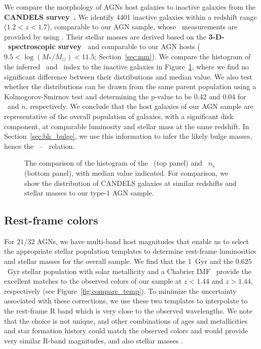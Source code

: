 \documentclass[apj]{emulateapj}
\begin{document}
We compare the morphology of AGNs host galaxies to inactive galaxies from the {\bf CANDELS survey~\citep{Grogin2011, Koekemoer2011}.} We identify 4401 inactive galaxies within a redshift range ($1.2<z<1.7$), comparable to our AGN sample, whose \sersic\ measurements are provided by \citet{VDwel++2012} using \galfit. Their stellar masses are derived based on the {\bf 3-D-\hst\ spectroscopic survey~\citep{Momcheva2016, Brammer2012} } and comparable to our AGN hosts ($9.5< \log (M_* /M_{\odot})< 11.5$; Section~\ref{sec:mm}). We compare the histogram of the inferred \Reff\ and \sersic\ index to the inactive galaxies in Figure~\ref{fig:hist_rn}, where we find no significant difference between their distributions and median value. We also test whether the distributions can be drawn from the same parent population using a Kolmogorov-Smirnov test and determining the p-value to be 0.42 and 0.04 for \Reff\ and $n$, respectively. We conclude that the host galaxies of our AGN sample are representative of the overall population of galaxies, with a significant disk component, at comparable luminosity and stellar mass at the same redshift. In Section~\ref{sec:bh_bulge}, we use this information to infer the likely bulge masses, hence the \mbh\ -- \bmass\ relation.



\begin{figure}[ht]
\caption{\label{fig:hist_rn} 
The comparison of the histogram of the \Reff\ (top panel) and \sersic\ $n_s$ (bottom panel), with median value indicated. For comparison, we show the distribution of CANDELS galaxies at similar redshifts and stellar masses to our type-1 AGN sample.}
\end{figure} 

\subsection{Rest-frame colors}

For $21/32$ AGNs, we have multi-band host magnitudes that enable us to select the appropriate stellar population templates to determine rest-frame luminosities and stellar masses for the overall sample.  We find that the $1$~Gyr and the $0.625$~Gyr stellar population with solar metallicity and a Chabrier IMF~\citep{Bruzual2003} provide the excellent matches to the observed colors of our sample at $z<1.44$ and $z>1.44$, respectively  (see Figure~\ref{fig:compare_temp}). To minimize the uncertainty associated with these corrections, we use these two templates to interpolate to the rest-frame R band which is very close to the observed wavelengths. We note that the choice is not unique, and other combinations of ages and metallicities and star formation history could match the observed colors and would provide very similar R-band magnitudes, and also stellar masses \citep{Bell2000, Bell2001}. 
\end{document}
